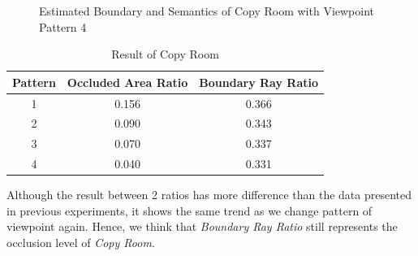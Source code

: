\documentclass[11pt, a4paper,oneside,chapterprefix=false]{scrbook}
\begin{document}
\begin{figure}[H]
    \centering
      \label{fig:copy b 200 6} \hfill
     \label{fig:copy s 200 6}
    \caption{Estimated Boundary and Semantics of Copy Room with Viewpoint Pattern 4}
    \label{fig:copy 6}
\end{figure}

\begin{table}[H]
    \centering
    \begin{tabular}{|c|c|c|}
        \hline
        \textbf{Pattern} & \textbf{Occluded Area Ratio} & \textbf{Boundary Ray Ratio} \\
        \hline
        1 & 0.156 & 0.366 \\
        2 & 0.090 & 0.343 \\
		3 & 0.070 & 0.337 \\
		4 & 0.040 & 0.331 \\
        \hline
    \end{tabular}
    \caption{Result of Copy Room}
    \label{tab:result of copy room}
\end{table}

Although the result between 2 ratios has more difference than the data presented in previous experiments, it shows the same trend as we change pattern of viewpoint again. Hence, we think that \emph{Boundary Ray Ratio} still represents the occlusion level of \emph{Copy Room}. 
\end{document}
